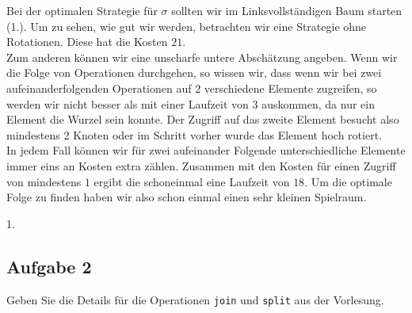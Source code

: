 \documentclass[11pt,a4paper,ngerman]{article}
\begin{document}
Bei der optimalen Strategie für $\sigma$ sollten wir im Linksvollständigen Baum starten (1.). Um zu sehen, wie gut wir werden,
betrachten wir eine Strategie ohne Rotationen. Diese hat die Kosten $21$.\\

Zum anderen können wir eine unscharfe untere Abschätzung angeben. Wenn wir die Folge von Operationen durchgehen, so wissen wir, 
dass wenn wir bei zwei aufeinanderfolgenden Operationen auf $2$ verschiedene Elemente zugreifen, so werden wir nicht besser als mit einer  Laufzeit von $3$ auskommen,
da nur ein Element die Wurzel sein konnte. Der Zugriff auf das zweite Element besucht also mindestens 2 Knoten oder im Schritt vorher wurde das Element hoch rotiert.\\

In jedem Fall können wir für zwei aufeinander Folgende unterschiedliche Elemente immer eins an Kosten extra zählen. Zusammen mit den Kosten für einen Zugriff von mindestens
$1$ ergibt die schoneinmal eine Laufzeit von $18$. Um die optimale Folge zu finden haben wir also schon einmal einen sehr kleinen Spielraum.

\begin{center}
   1.
\end{center}

\subsection*{Aufgabe 2}

Geben Sie die Details für die Operationen \lstinline|join| und \lstinline|split| aus der Vorlesung.
\end{document}
